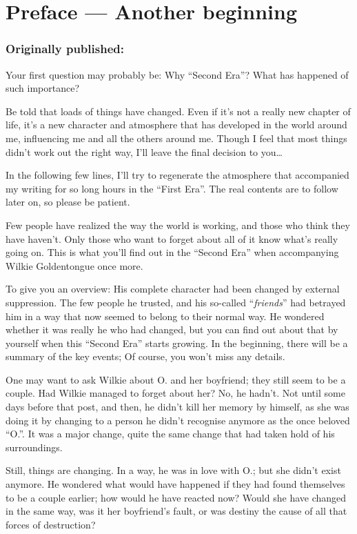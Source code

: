 \mainmatter
\chapter{Preface --- Another beginning}
\label{cha:preface}
\subsection*{Originally published: }
Your first question may probably be: Why \enquote{Second Era}? What has happened of such importance?

Be told that loads of things have changed. Even if it's not a really new chapter of life, it's a new character and atmosphere that has developed in the world around me, influencing me and all the others around me. Though I feel that most things didn't work out the right way, I'll leave the final decision to you\ldots

In the following few lines, I'll try to regenerate the atmosphere that accompanied my writing for so long hours in the \enquote{First Era}. The real contents are to follow later on, so please be patient.

Few people have realized the way the world is working, and those who think they have haven't. Only those who want to forget about all of it know what's really going on. This is what you'll find out in the \enquote{Second Era} when accompanying Wilkie Goldentongue once more.

To give you an overview: His complete character had been changed by external suppression. The few people he trusted, and his so-called \enquote{\emph{friends}} had betrayed him in a way that now seemed to belong to their normal way. He wondered whether it was really he who had changed, but you can find out about that by yourself when this \enquote{Second Era} starts growing. In the beginning, there will be a summary of the key events; Of course, you won't miss any details.

One may want to ask Wilkie about O. and her boyfriend; they still seem to be a couple. Had Wilkie managed to forget about her? No, he hadn't. Not until some days before that post, and then, he didn't kill her memory by himself, as she was doing it by changing to a person he didn't recognise anymore as the once beloved \enquote{O.}. It was a major change, quite the same change that had taken hold of his surroundings.

Still, things are changing. In a way, he was in love with O.; but she didn't exist anymore. He wondered what would have happened if they had found themselves to be a couple earlier; how would he have reacted now? Would she have changed in the same way, was it her boyfriend's fault, or was destiny the cause of all that forces of destruction?

